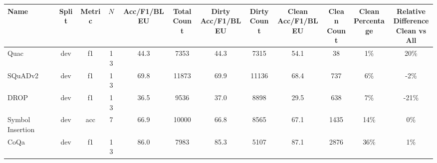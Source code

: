     \begin{table}
        {
        \footnotesize
        \begin{adjustwidth}{-1.4in}{-1.4in}
    \begin{center}
    \begin{tabular}{lccccccccccc}
\toprule
                Name &  Split & Metric &   $N$ & Acc/F1/BLEU & \shortstack{Total\\Count} & \shortstack{Dirty\\Acc/F1/BLEU} & \shortstack{Dirty\\Count} & \shortstack{Clean\\Acc/F1/BLEU} & \shortstack{Clean\\Count} & \shortstack{Clean\\Percentage} & \shortstack{Relative\\Difference\\Clean vs All} \\
\midrule
                Quac &   dev &       f1 &  13 &        44.3 &                      7353 &                            44.3 &                      7315 &                            54.1 &                        38 &                             1\% &                                                20\% \\
             SQuADv2 &   dev &       f1 &  13 &        69.8 &                     11873 &                            69.9 &                     11136 &                            68.4 &                       737 &                             6\% &                                                -2\% \\
                DROP &   dev &       f1 &  13 &        36.5 &                      9536 &                            37.0 &                      8898 &                            29.5 &                       638 &                             7\% &                                               -21\% \\
    Symbol Insertion &   dev &      acc &   7 &        66.9 &                     10000 &                            66.8 &                      8565 &                            67.1 &                      1435 &                            14\% &                                                 0\% \\
                CoQa &   dev &       f1 &  13 &        86.0 &                      7983 &                            85.3 &                      5107 &                            87.1 &                      2876 &                            36\% &                                                 1\% \\

\end{tabular}
\end{center}
\end{adjustwidth}}
\end{table}
